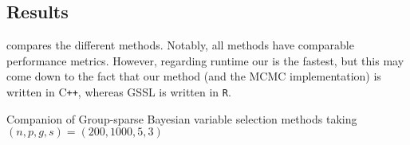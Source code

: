 
\subsection{Results}

 compares the different methods. Notably, all methods have comparable performance metrics. However, regarding runtime our is the fastest, but this may come down to the fact that our method (and the MCMC implementation) is written in C\texttt{++}, whereas GSSL is written in \texttt{R}.

\begin{table}[htp]
    \centering
    \centerline{\resizebox{1.2\textwidth}{!}{}}
    \caption{Companion of Group-sparse Bayesian variable selection methods taking $(n, p, g, s) = (200, 1000, 5, 3)$}
    \label{tab:bvs_comprison}
\end{table}


